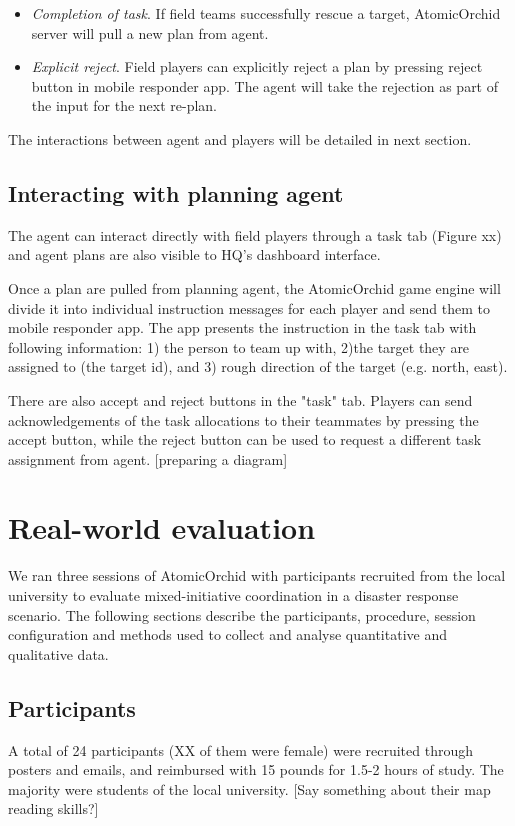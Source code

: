 \begin{itemize}
\item \textit{Completion of task}. If field teams successfully rescue a target, AtomicOrchid server will pull a new plan from agent.
\item \textit{Explicit reject}. Field players can explicitly reject a plan by pressing reject button in mobile responder app. The agent will take the rejection as part of the input for the next re-plan.
\end{itemize} 

The interactions between agent and players will be detailed in next section.
\subsection{Interacting with planning agent}
The agent can interact directly with field players through a task tab (Figure xx) and agent plans are also visible to HQ's dashboard interface.

Once a plan are pulled from planning agent, the AtomicOrchid game engine will divide it into individual instruction messages for each player and send them to mobile responder app. The app presents the instruction in the task tab with following information: 1) the person to team up with, 2)the target they are assigned to (the target id), and 3) rough direction of the target (e.g. north, east). 

There are also accept and reject buttons in the "task" tab. Players can send acknowledgements of the task allocations to their teammates by pressing the accept button, while the reject button can be used to request a different task assignment from agent. [preparing a diagram]
 





\section{Real-world evaluation}
We ran three sessions of AtomicOrchid with participants recruited from the local university to evaluate mixed-initiative coordination in a disaster response scenario. The following sections describe the participants, procedure, session configuration and methods used to collect and analyse quantitative and qualitative data.

\subsection{Participants}
A total of 24 participants (XX of them were female) were recruited through posters and emails, and reimbursed with 15 pounds for 1.5-2 hours of study. The majority were students of the local university. [Say something about their map reading skills?]

